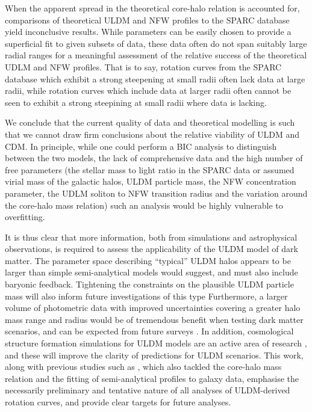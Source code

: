 \documentclass{pasa}%
\begin{document}
When the apparent spread in the theoretical core-halo relation is accounted for, comparisons of theoretical ULDM and NFW profiles to the SPARC database yield inconclusive results. While parameters can be easily chosen to provide a superficial fit to given subsets of data, these data often do not span suitably large radial ranges for a meaningful assessment of the relative success of the theoretical UDLM and NFW profiles. That is to say, rotation curves from the SPARC database which exhibit a strong steepening at small radii often lack data at large radii, while rotation curves which include data at larger radii often cannot be seen to exhibit a strong steepining at small radii where data is lacking.

We conclude that the current quality of data and theoretical modelling is such that we cannot draw firm conclusions about the relative viability of ULDM and CDM. In principle, while one could perform a BIC analysis to distinguish between the two models, the lack of comprehensive data and the high number of free parameters (the stellar mass to light ratio in the SPARC data or assumed virial mass of the galactic halos,  ULDM particle mass, the NFW concentration parameter, the UDLM soliton to NFW transition radius and the variation around the core-halo mass relation) such an analysis would be highly vulnerable to overfitting.

It is thus clear that more information, both from simulations and astrophysical observations, is required to  assess the applicability of the ULDM model of dark matter. The parameter space describing ``typical'' ULDM halos appears to be larger than simple semi-analytical models would suggest, and must also include  baryonic feedback. Tightening the constraints on the plausible ULDM particle mass will also inform future investigations of this type \cite{Castellano:2019hdd, Lidz:2018fqo, Davoudiasl:2019nlo} Furthermore, a larger volume of photometric data with improved uncertainties covering a greater halo mass range and radius would be of tremendous benefit when testing dark matter scenarios, and can be expected from future surveys \cite{Simon:2019kmm}. In addition, cosmological structure formation simulations for ULDM models are an active area of research \cite{Lin:2018whl, Clough:2018exo, Mocz:2015sda}, and these will improve the clarity of predictions for ULDM scenarios. 
This work, along with previous studies such as \cite{Bar2018acw}, which also tackled the core-halo mass relation and the fitting of semi-analytical profiles to galaxy data, emphasise the necessarily preliminary and tentative nature of all analyses of ULDM-derived rotation curves, and provide clear targets for future analyses. 
\end{document}
